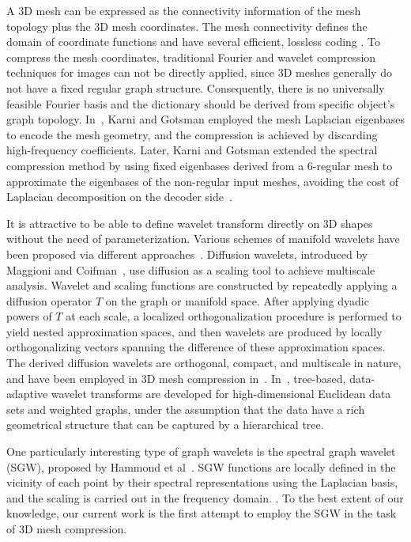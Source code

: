 A 3D mesh can be expressed as the connectivity information of the mesh
topology plus the 3D mesh coordinates. The mesh connectivity defines
the domain of coordinate functions and have several efficient,
lossless coding \cite{Rossignac1999,Gumhold:1998}. To compress the
mesh coordinates, traditional Fourier and wavelet compression
techniques for images can not be directly applied, since 3D meshes
generally do not have a fixed regular graph structure. Consequently,
there is no universally feasible Fourier basis and the dictionary
should be derived from specific object's graph topology.
In~\cite{Karni2000}, Karni and Gotsman employed the mesh
Laplacian eigenbases to encode the mesh geometry, and the compression
is achieved by discarding high-frequency coefficients. Later, Karni
and Gotsman extended the spectral compression method by using fixed
eigenbases derived from a 6-regular mesh to approximate the eigenbases
of the non-regular input meshes, avoiding the cost of Laplacian
decomposition on the decoder side~\cite{karni20013d}.

It is attractive to be able to define wavelet transform directly on 3D
shapes without the need of parameterization. Various schemes of
manifold wavelets have been proposed via different
approaches~\cite{Antoine2010189}. Diffusion wavelets, introduced by
Maggioni and Coifman~\cite{Coifman2006}, use diffusion as a
scaling tool to achieve multiscale analysis. Wavelet and scaling
functions are constructed by repeatedly applying a diffusion operator
$T$ on the graph or manifold space. After applying dyadic powers of
$T$ at each scale, a localized orthogonalization procedure is
performed to yield nested approximation spaces, and then wavelets are
produced by locally orthogonalizing vectors spanning the difference of
these approximation spaces. The derived diffusion wavelets are
orthogonal, compact, and multiscale in nature, and have been employed
in 3D mesh compression
in~\cite{mahadevan2007AdaMesCom3DComGraUsiMulManLea}.
In~\cite{gavish2010multiscale,ram2012redundant}, tree-based,
data-adaptive wavelet transforms are developed for high-dimensional
Euclidean data sets and weighted graphs, under the assumption that the
data have a rich geometrical structure that can be captured by a
hierarchical tree.

One particularly interesting type of graph wavelets is the spectral
graph wavelet (SGW), proposed by Hammond et
al~\cite{Hammond2011}. SGW functions are locally defined in
the vicinity of each point by their spectral representations using
the Laplacian basis, and the scaling is carried out in the frequency
domain. . To the best extent of our
knowledge, our current work is the first attempt to employ the SGW in
the task of 3D mesh compression.

